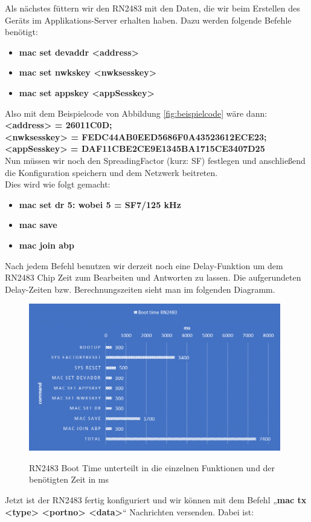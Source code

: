 Als nächstes füttern wir den RN2483 mit den Daten, die wir beim Erstellen des Geräts im Applikations-Server erhalten haben. Dazu werden folgende Befehle benötigt:
\begin{itemize}
    \item \textbf{mac set devaddr <address>}
    \item \textbf{mac set nwkskey <nwksesskey>}
    \item \textbf{mac set appskey <appSesskey>}
\end{itemize}
Also mit dem Beispielcode von Abbildung \ref{fig:beispielcode} wäre dann:\\
\textbf{<address> = 26011C0D;}\\
\textbf{<nwksesskey> = FEDC44AB0EED5686F0A43523612ECE23;}\\
\textbf{<appSesskey> = DAF11CBE2CE9E1345BA1715CE3407D25}\\

Nun müssen wir noch den SpreadingFactor (kurz: SF) festlegen und anschließend die Konfiguration speichern und dem Netzwerk beitreten.\\
Dies wird wie folgt gemacht: 

\begin{itemize}
    \item \textbf{mac set dr 5: wobei 5 = SF7/125 kHz}
    \item \textbf{mac save}
    \item \textbf{mac join abp}
\end{itemize}

Nach jedem Befehl benutzen wir derzeit noch eine Delay-Funktion um dem RN2483 Chip Zeit zum Bearbeiten und Antworten zu lassen. Die aufgerundeten Delay-Zeiten bzw. Berechnungszeiten sieht man im folgenden Diagramm.

\begin{figure}[ht]
    \center
    \includegraphics[width=11cm]{Bilder/lora-9.png}\\
    \caption{RN2483 Boot Time unterteilt in die einzelnen Funktionen und der benötigten Zeit in ms}
    \label{fig:boot-time}
\end{figure}
Jetzt ist der RN2483 fertig konfiguriert und wir können mit dem Befehl „\textbf{mac tx <type> <portno> <data>}“ Nachrichten versenden. Dabei ist:\\

